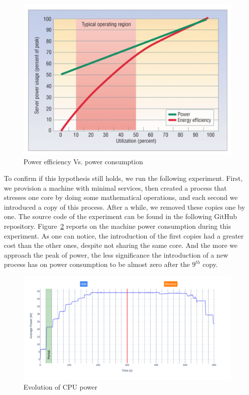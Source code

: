 \begin{figure}[!h]
      \centering
      \includegraphics[width=.7\linewidth,keepaspectratio]{chapters/soa_energy_efficiency}
      \caption{Power efficiency Vs. power consumption~\cite{barroso2007case}}
      \label{fig:soa_energy_efficiency}
\end{figure}

To confirm if this hypothesis still holds, we run the following experiment.
First, we provision a machine with minimal services, then created a process that stresses one core by doing some mathematical operations, and each second we introduced a copy of this process.
After a while, we removed these copies one by one.
The source code of the experiment can be found in the following GitHub repository.
Figure~\ref{fig:power_evolution_greenfaas} reports on the machine power consumption during this experiment.
As one can notice, the introduction of the first copies had a greater cost than the other ones, despite not sharing the same core.
And the more we approach the peak of power, the less significance the introduction of a new process has on power consumption to be almost zero after the $9^{th}$ copy.

\begin{figure}[!h]
      \centering
      \includegraphics[width=\linewidth]{chapters/power_evolution_greenfaas}
      \caption{Evolution of CPU power}
      \label{fig:power_evolution_greenfaas}
\end{figure}

